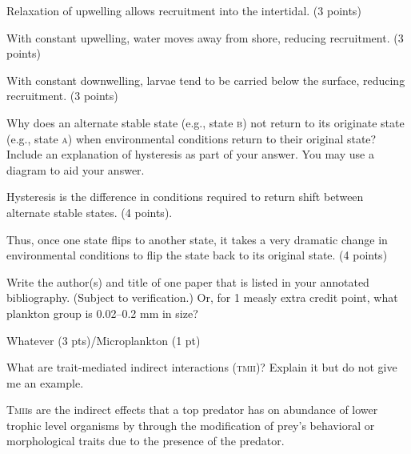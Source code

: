 \documentclass[12pt, addpoints]{exam}
\newcommand*\AnswerBox[2]{%
    \parbox[t][#1]{0.92\textwidth}{%
    \begin{solution}#2\end{solution}}
    \vspace*{\stretch{1}}
}
\newenvironment{AnswerPage}[1]
    {\begin{minipage}[t][#1]{0.92\textwidth}%
    \begin{solution}}
    {\end{solution}\end{minipage}
    \vspace*{\stretch{1}}}
\begin{document}
\begin{questions}
	\begin{AnswerPage}{0.3\textheight}%
	 Relaxation of upwelling allows recruitment into the intertidal. (3 points)
	 
	 \vspace*{\baselineskip}
	 
	 With constant upwelling, water moves away from shore, reducing recruitment. (3 points)
	 
	 \vspace*{\baselineskip}
	 
	 With constant downwelling, larvae tend to be carried below the surface, reducing recruitment. (3 points)
	
	\end{AnswerPage}

%
\question[10]
Why does an alternate stable state (e.g., state \textsc{b}) not return to its originate state (e.g., state \textsc{a}) when environmental conditions return to their original state? Include an explanation of hysteresis as part of your answer. You may use a diagram to aid your answer.


	\begin{AnswerPage}{0.4\textheight}%
	 Hysteresis is the difference in conditions required to return shift between alternate stable states. (4 points).
	 
	\vspace*{\baselineskip}
		
	Thus, once one state flips to another state, it takes a very dramatic change in environmental conditions to flip the state back to its original state. (4 points)
	
	\end{AnswerPage}


%
\bonusquestion[3]
Write the author(s) and title of one paper that is listed in your annotated bibliography. (Subject to verification.) Or, for 1 measly extra credit point, what plankton group is 0.02–0.2 mm in size?

\AnswerBox{-\baselineskip}{Whatever (3 pts)/Microplankton (1 pt)}

\newpage

%
\question[5]
What are trait-mediated indirect interactions (\textsc{tmii})? Explain it but do not give me an example.

\AnswerBox{2\baselineskip}{\textsc{Tmii}s are the indirect effects that a top predator has on abundance of lower trophic level organisms by through the modification of prey's behavioral or morphological traits due to the presence of the predator. }


\end{questions}
\end{document}
